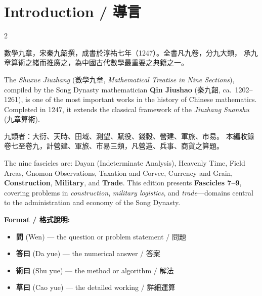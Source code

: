 \documentclass[11pt,a4paper]{article}
\begin{document}
\tableofcontents
\newpage

\section*{Introduction / 導言}

\begin{paracol}{2}

\textcolor{chinesecolor}{%
數學九章，宋秦九韶撰，成書於淳祐七年（1247）。全書凡九卷，分九大類，
承九章算術之緒而推廣之，為中國古代數學最重要之典籍之一。
}

\switchcolumn

\textcolor{englishcolor}{%
The \textit{Shuxue Jiuzhang} (數學九章, \textit{Mathematical Treatise in Nine Sections}),
compiled by the Song Dynasty mathematician \textbf{Qin Jiushao} (秦九韶, ca.~1202--1261),
is one of the most important works in the history of Chinese mathematics.
Completed in 1247, it extends the classical framework of the
\textit{Jiuzhang Suanshu} (九章算術).
}

\switchcolumn*

\textcolor{chinesecolor}{%
九類者：大衍、天時、田域、測望、賦役、錢穀、營建、軍旅、市易。
本編收錄卷七至卷九，計營建、軍旅、市易三類，凡營造、兵事、商貨之算題。
}

\switchcolumn

\textcolor{englishcolor}{%
The nine fascicles are: Dayan (Indeterminate Analysis), Heavenly Time,
Field Areas, Gnomon Observations, Taxation and Corvee, Currency and Grain,
\textbf{Construction}, \textbf{Military}, and \textbf{Trade}.
This edition presents \textbf{Fascicles 7--9}, covering problems in
\textit{construction}, \textit{military logistics}, and \textit{trade}---domains
central to the administration and economy of the Song Dynasty.
}

\end{paracol}

\medskip
\noindent\textbf{Format / 格式說明:}
\begin{itemize}
  \item \textbf{問} (Wen) --- the question or problem statement / 問題
  \item \textbf{答曰} (Da yue) --- the numerical answer / 答案
  \item \textbf{術曰} (Shu yue) --- the method or algorithm / 解法
  \item \textbf{草曰} (Cao yue) --- the detailed working / 詳細運算
\end{itemize}
\end{document}
